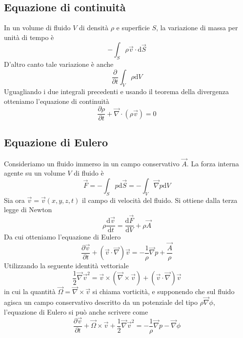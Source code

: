 \documentclass[a4paper,11pt]{article}
\begin{document}
\subsection{Equazione di continuità}
In un volume di fluido $V$ di densità $\rho$ e superficie $S$, la variazione di massa per unità di tempo è
\[-\int_{S}\rho\vec{v}\cdot\mathrm{d}\vec{S}\]
D'altro canto tale variazione è anche
\[\frac{\partial}{\partial t}\int_{V}\rho\mathrm{d}V\]
Uguagliando i due integrali precedenti e usando il teorema della divergenza otteniamo l'equazione di continuità
\[\frac{\partial\rho}{\partial t}+\vec{\nabla}\cdot(\rho\vec{v})=0\]

\subsection{Equazione di Eulero}
Consideriamo un fluido immerso in un campo conservativo $\vec{A}$. La forza interna agente su un volume $V$ di fluido è
\[\vec{F}=-\int_{S}p\mathrm{d}\vec{S}=-\int_{V}\vec{\nabla} p\mathrm{d}V\]
Sia ora $\vec{v}=\vec{v}(x,y,z,t)$ il campo di velocità del fluido. Si ottiene dalla terza legge di Newton
\[\rho\frac{\mathrm{d}\vec{v}}{\mathrm{d}t}=\frac{\mathrm{d}\vec{F}}{\mathrm{d}V}+\rho\vec{A}\]
Da cui otteniamo l'equazione di Eulero
\[\frac{\partial\vec{v}}{\partial t}+(\vec{v}\cdot\vec{\nabla})\vec{v}=-\frac{1}{\rho}\vec{\nabla}p+\frac{\vec{A}}{\rho}\]
Utilizzando la seguente identità vettoriale
\begin{equation}\frac{1}{2}\vec{\nabla}\vec v^2=\vec v\times(\vec{\nabla}\times\vec v)+(\vec v\cdot\vec \nabla)\vec v\label{vettori}\end{equation}
in cui la quantità $\vec{\Omega}=\vec{\nabla}\times \vec{v}$ si chiama vorticità, e supponendo che sul fluido agisca un campo conservativo descritto da un potenziale del tipo $\rho\vec{\nabla}\phi$, l'equazione di Eulero si può anche scrivere come
\[\frac{\partial \vec{v}}{\partial t}+\vec{\Omega}\times\vec{v}+\frac{1}{2}\vec{\nabla}\vec{v}^2=-\frac{1}{\rho}\vec{\nabla}p-\vec{\nabla}\phi\]
\end{document}
